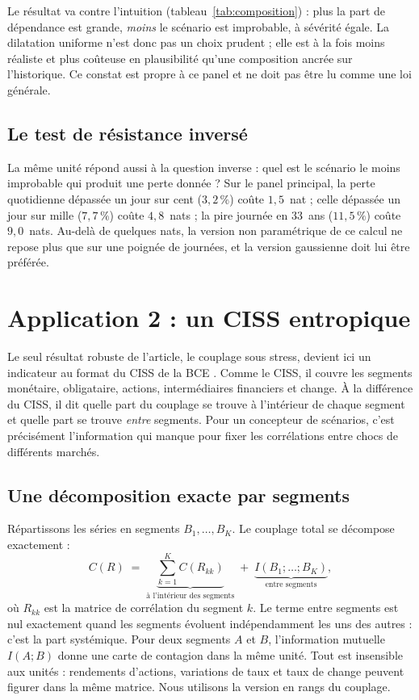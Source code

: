 \documentclass[11pt]{article}
\theoremstyle{definition}
\begin{document}
Le résultat va contre l'intuition (tableau~\ref{tab:composition}) : plus la
part de dépendance est grande, \emph{moins} le scénario est improbable, à
sévérité égale. La dilatation uniforme n'est donc pas un choix prudent ; elle
est à la fois moins réaliste et plus coûteuse en plausibilité qu'une
composition ancrée sur l'historique. Ce constat est propre à ce panel et ne
doit pas être lu comme une loi générale.

\subsection{Le test de résistance inversé}

La même unité répond aussi à la question inverse : quel est le scénario le
moins improbable qui produit une perte donnée ? Sur le panel principal, la
perte quotidienne dépassée un jour sur cent ($3{,}2\,\%$) coûte $1{,}5$~nat ;
celle dépassée un jour sur mille ($7{,}7\,\%$) coûte $4{,}8$~nats ; la pire
journée en 33~ans ($11{,}5\,\%$) coûte $9{,}0$~nats. Au-delà de quelques nats,
la version non paramétrique de ce calcul ne repose plus que sur une poignée de
journées, et la version gaussienne doit lui être préférée.

\section{Application 2 : un CISS entropique}
\label{sec:cb}

Le seul résultat robuste de l'article, le couplage sous stress, devient ici un
indicateur au format du CISS de la BCE \citep{hollo2012}. Comme le CISS, il
couvre les segments monétaire, obligataire, actions, intermédiaires financiers
et change. À la différence du CISS, il dit quelle part du couplage se trouve à
l'intérieur de chaque segment et quelle part se trouve \emph{entre} segments.
Pour un concepteur de scénarios, c'est précisément l'information qui manque
pour fixer les corrélations entre chocs de différents marchés.

\subsection{Une décomposition exacte par segments}

Répartissons les séries en segments $B_1,\dots,B_K$. Le couplage total se
décompose exactement :
\begin{equation}
\label{eq:blocks}
C(R) \;=\; \underbrace{\sum_{k=1}^{K} C(R_{kk})}_{\text{à l'intérieur des segments}}
\;+\; \underbrace{I(B_1;\dots;B_K)}_{\text{entre segments}},
\end{equation}
où $R_{kk}$ est la matrice de corrélation du segment $k$. Le terme entre
segments est nul exactement quand les segments évoluent indépendamment les uns
des autres : c'est la part systémique. Pour deux segments $A$ et $B$,
l'information mutuelle $I(A;B)$ donne une carte de contagion dans la même
unité. Tout est insensible aux unités : rendements d'actions, variations de
taux et taux de change peuvent figurer dans la même matrice. Nous utilisons la
version en rangs du couplage.
\end{document}
